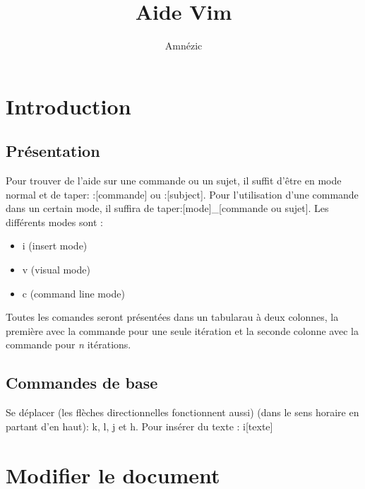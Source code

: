 \documentclass{article}
\author{Amnézic}
\date{}
\title{Aide Vim}
\begin{document}
\maketitle
\newpage
\tableofcontents
\newpage
\section{Introduction}
\subsection{Présentation}
Pour trouver de l'aide sur une commande ou un sujet, il suffit d'être en mode normal et de taper: :[commande] ou :[subject]. Pour l'utilisation d'une commande dans un certain mode, il suffira de taper:[mode]\_[commande ou sujet]. Les différents modes sont :
\begin{itemize}
    \item i (insert mode)
    \item v (visual mode)
    \item c (command line mode)
\end{itemize}
Toutes les comandes seront présentées dans un tabularau à deux colonnes, la première avec la commande pour une seule itération et la seconde colonne avec la commande pour \textit{n} itérations.
\subsection{Commandes de base}
Se déplacer (les flèches directionnelles fonctionnent aussi) (dans le sens horaire en partant d'en haut): k, l, j et h.\newline
Pour insérer du texte : i[texte]

\section{Modifier le document}
\end{document}
